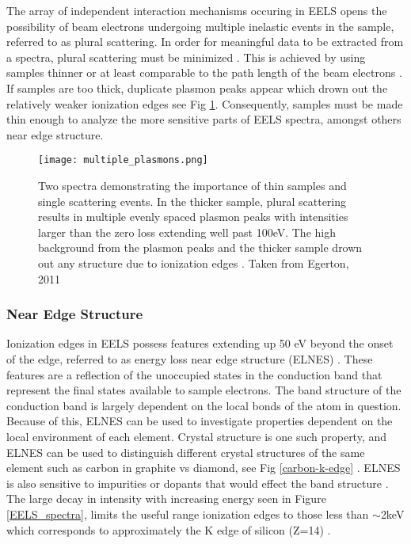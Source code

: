 The array of independent interaction mechanisms occuring in EELS opens the possibility of beam electrons undergoing multiple inelastic events in the sample, referred to as plural scattering.  In order for meaningful data to be extracted from a spectra, plural scattering must be minimized \cite{Egerton}. This is achieved by using samples thinner or at least comparable to the path length of the beam electrons \cite{Egerton}.  If samples are too thick, duplicate plasmon peaks appear which  drown out the relatively weaker ionization edges see Fig \ref{multiple_plasmons}.   Consequently, samples must be made thin enough to analyze the more sensitive parts of EELS spectra, amongst others near edge structure. \\

\begin{figure}
	\centering
	\texttt{[image: multiple\_plasmons.png]}
	\caption{Two spectra demonstrating the importance of thin samples and single scattering events. In the thicker sample, plural scattering results in multiple evenly spaced plasmon peaks with  intensities larger than the zero loss extending well past 100eV.  The high background from the plasmon peaks and the thicker sample drown out any structure due to ionization edges \cite{Egerton}. Taken from Egerton, 2011 \cite{Egerton}}
	\label{multiple_plasmons}
\end{figure}





\subsubsection{Near Edge Structure}
Ionization edges in EELS possess features extending up 50 eV beyond the onset of the edge, referred to as energy loss near edge structure (ELNES) \cite{Egerton}.   These features are a reflection of the unoccupied states in the conduction band that represent the final states available to sample electrons.  The band structure of the conduction band is largely dependent on the local bonds of the atom in question.  Because of this, ELNES can be used to investigate properties dependent on the local environment of each element.   Crystal structure is one such property, and ELNES can be used to distinguish different crystal structures of the same element such as carbon in graphite vs diamond, see Fig \ref{carbon-k-edge} \cite{hamon_elnes_2004}.  ELNES is also sensitive to impurities or dopants that would effect the band structure \cite{torrisi_atomic_2016}.  The large decay in intensity with increasing energy seen in Figure \ref{EELS_spectra}, limits the useful range ionization edges to those less than $\sim$2keV which corresponds to approximately the K edge of silicon (Z=14) \cite{reimer_transmission_2008}.  \\


